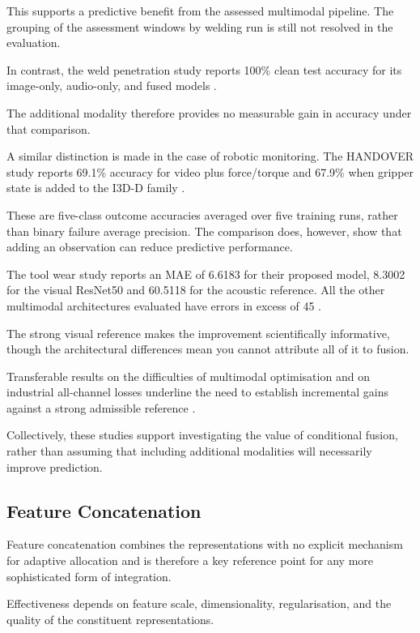This supports a predictive benefit from the assessed multimodal pipeline. The grouping of the
assessment windows by welding run is still not resolved in the evaluation.

In contrast, the weld penetration study reports 100\% clean test accuracy for its image-only,
audio-only, and fused models \citep[PDF pp.~18, 22, Tables~1--3]{Hua2026Weld}.

The additional modality therefore provides no measurable gain in accuracy under that comparison.

A similar distinction is made in the case of robotic monitoring. The HANDOVER study reports 69.1\%
accuracy for video plus force/torque and 67.9\% when gripper state is added to the I3D-D family
\citep[PDF p.~7, Table~III]{Thoduka2024Handover}.

These are five-class outcome accuracies averaged over five training runs, rather than binary failure
average precision. The comparison does, however, show that adding an observation can reduce
predictive performance.

The tool wear study reports an MAE of 6.6183 for their proposed model, 8.3002 for the visual
ResNet50 and 60.5118 for the acoustic reference. All the other multimodal architectures evaluated
have errors in excess of 45 \citep[PDF p.~24, Table~1]{P045}.

The strong visual reference makes the improvement scientifically informative, though the
architectural differences mean you cannot attribute all of it to fusion.

Transferable results on the difficulties of multimodal optimisation and on industrial all-channel
losses underline the need to establish incremental gains against a strong admissible reference
\citep{Wang2020What,Goodarzi2023Deep}.

Collectively, these studies support investigating the value of conditional fusion, rather than
assuming that including additional modalities will necessarily improve prediction.

\subsection{Feature Concatenation}

Feature concatenation combines the representations with no explicit mechanism for adaptive
allocation and is therefore a key reference point for any more sophisticated form of integration.

Effectiveness depends on feature scale, dimensionality, regularisation, and the quality of the
constituent representations.

